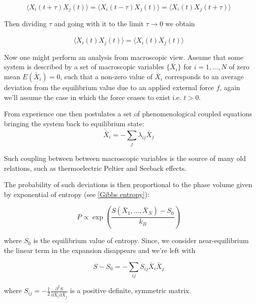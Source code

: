 \documentclass[a4paper,12pt]{article}
\begin{document}
\begin{equation}
  \langle X_i(t+\tau) X_j(t) \rangle =   \langle X_i(t-\tau) X_j(t) \rangle =  \langle X_i(t) X_j(t+\tau) \rangle
\end{equation}

Then dividing $\tau$ and going with it to the limit $\tau \to 0$ we obtain 

\begin{equation}
\label{CorrelationTimeDerivative}
  \langle \dot{X}_i(t) X_j(t) \rangle = \langle X_i(t) \dot{X}_j(t) \rangle
\end{equation}

Now one might perform an analysis from macroscopic view.
Assume that some system is described by a set of macroscopic variables $\{\bar{X}_i\}$ for $i=1,...,N$ of zero mean $E(\bar{X}_i)=0$, such that a non-zero value of $\bar{X}_i$ corresponds to an average deviation from the equilibrium value due to an applied external force $f$, again we'll assume the case in which the force ceases to exist i.e. $t>0$. 

From experience one then postulates a set of phenomenological coupled equations bringing the system back to equilibrium state: 
\begin{equation}
\label{LinearResponseEq}
  \dot{\bar{X}}_i=-\sum_j \lambda_{ij} \bar{X}_j
\end{equation}

Such coupling between between macroscopic variables is the source of many old relations, such as thermoelectric Peltier and Seeback effects.

The probability of such deviations is then proportional to the phase volume given by exponential of entropy (see \ref{Gibbs entropy}):

\begin{equation}
  P \propto \exp(\frac{S(\bar{X}_1,...,\bar{X}_N)-S_0}{k_B})
\end{equation}

where $S_0$ is the equilibrium value of entropy. Since, we consider near-equilibrium the linear term in the expansion disappears and we're left with

\begin{equation}
  S-S_0 = - \sum_{ij} S_{ij}\bar{X}_i \bar{X}_j
\end{equation}

where $S_{ij}= -\frac{1}{2}\frac{\partial^2{S}}{\partial{\bar{X}_i}\partial{\bar{X}_j}}$ is a positive definite, symmetric matrix. %
\end{document}
